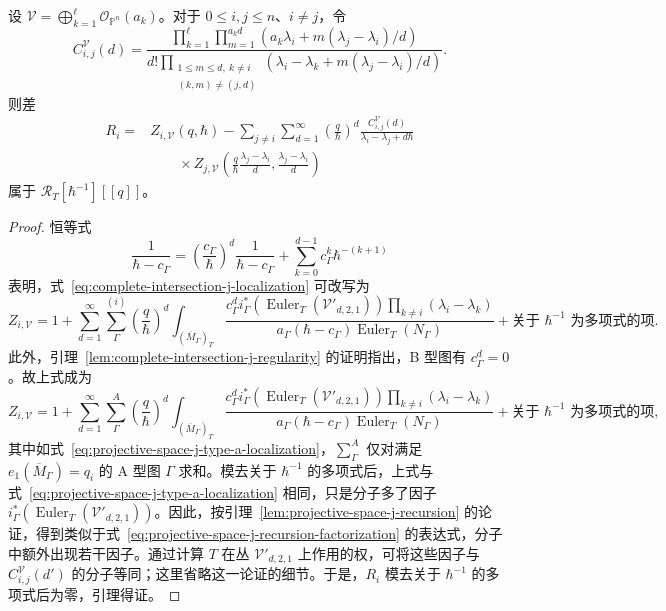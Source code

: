 \begin{lemma}[递推引理]\label{lem:complete-intersection-j-recursion}
设 $\mathcal V=\bigoplus_{k=1}^{\ell}\mathcal O_{\mathbb P^n}(a_k)$。对于 $0\le i,j\le n$、$i\ne j$，令
\[
C_{i,j}^{\mathcal V}(d)=\frac{\prod_{k=1}^{\ell}\prod_{m=1}^{a_kd}(a_k\lambda_i+m(\lambda_j-\lambda_i)/d)}{d!\displaystyle\prod_{\substack{1\le m\le d,\ k\ne i\\(k,m)\ne(j,d)}}(\lambda_i-\lambda_k+m(\lambda_j-\lambda_i)/d)}.
\]
则差
\[
\begin{aligned}
R_i={}&Z_{i,\mathcal V}(q,\hbar)-\sum_{j\ne i}\sum_{d=1}^{\infty}\left(\frac q\hbar\right)^d
\frac{C_{i,j}^{\mathcal V}(d)}{\lambda_i-\lambda_j+d\hbar}\\
&\hspace{2em}\times Z_{j,\mathcal V}\left(\frac q\hbar\frac{\lambda_j-\lambda_i}{d},\frac{\lambda_j-\lambda_i}{d}\right)
\end{aligned}
\]
属于 $\mathcal R_T[\hbar^{-1}][[q]]$。
\end{lemma}
\begin{proof}
恒等式
\[
\frac1{\hbar-c_\Gamma}=\left(\frac{c_\Gamma}{\hbar}\right)^d\frac1{\hbar-c_\Gamma}
+\sum_{k=0}^{d-1}c_\Gamma^k\hbar^{-(k+1)}
\]
表明，式~\eqref{eq:complete-intersection-j-localization} 可改写为
\[
Z_{i,\mathcal V}=1+\sum_{d=1}^{\infty}\sum_\Gamma^{(i)}\left(\frac q\hbar\right)^d
\int_{(\overline M_\Gamma)_T}\frac{c_\Gamma^d i_\Gamma^*(\operatorname{Euler}_T(\mathcal V'_{d,2,1}))\prod_{k\ne i}(\lambda_i-\lambda_k)}{a_\Gamma(\hbar-c_\Gamma)\operatorname{Euler}_T(N_\Gamma)}
+\text{关于 $\hbar^{-1}$ 为多项式的项}.
\]
此外，引理~\ref{lem:complete-intersection-j-regularity} 的证明指出，B 型图有 $c_\Gamma^d=0$。故上式成为
\[
Z_{i,\mathcal V}=1+\sum_{d=1}^{\infty}\sum_\Gamma^A\left(\frac q\hbar\right)^d
\int_{(\overline M_\Gamma)_T}\frac{c_\Gamma^d i_\Gamma^*(\operatorname{Euler}_T(\mathcal V'_{d,2,1}))\prod_{k\ne i}(\lambda_i-\lambda_k)}{a_\Gamma(\hbar-c_\Gamma)\operatorname{Euler}_T(N_\Gamma)}
+\text{关于 $\hbar^{-1}$ 为多项式的项},
\]
其中如式~\eqref{eq:projective-space-j-type-a-localization}，$\sum_\Gamma^A$ 仅对满足 $e_1(\overline M_\Gamma)=q_i$ 的 A 型图 $\Gamma$ 求和。模去关于 $\hbar^{-1}$ 的多项式后，上式与式~\eqref{eq:projective-space-j-type-a-localization} 相同，只是分子多了因子 $i_\Gamma^*(\operatorname{Euler}_T(\mathcal V'_{d,2,1}))$。因此，按引理~\ref{lem:projective-space-j-recursion} 的论证，得到类似于式~\eqref{eq:projective-space-j-recursion-factorization} 的表达式，分子中额外出现若干因子。通过计算 $T$ 在丛 $\mathcal V'_{d,2,1}$ 上作用的权，可将这些因子与 $C_{i,j}^{\mathcal V}(d')$ 的分子等同；这里省略这一论证的细节。于是，$R_i$ 模去关于 $\hbar^{-1}$ 的多项式后为零，引理得证。
\end{proof}

